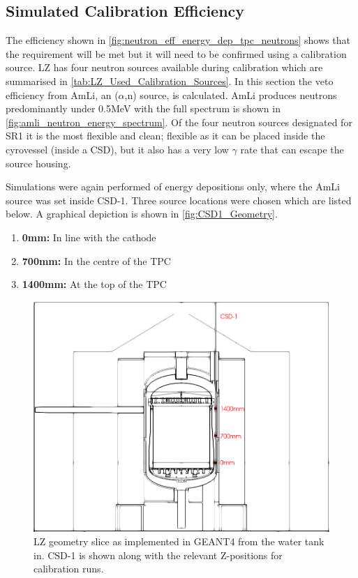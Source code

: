 \subsection{Simulated Calibration Efficiency}
\par
The efficiency shown in \autoref{fig:neutron_eff_energy_dep_tpc_neutrons} shows that the requirement will be met but it will need to be confirmed using a calibration source.
LZ has four neutron sources available during calibration which are summarised in \autoref{tab:LZ_Used_Calibration_Sources}.
In this section the veto efficiency from AmLi, an ($\alpha$,n) source, is calculated.
AmLi produces neutrons predominantly under 0.5MeV with the full spectrum is shown in \autoref{fig:amli_neutron_energy_spectrum}.
Of the four neutron sources designated for SR1 it is the most flexible and clean; flexible as it can be placed inside the cyrovessel (inside a CSD), but it also has a very low $\gamma$ rate that can escape the source housing.



\par
Simulations were again performed of energy depositions only, where the AmLi source was set inside CSD-1.
Three source locations were chosen which are listed below. A graphical depiction is shown in \autoref{fig:CSD1_Geometry}. 
\begin{enumerate}
    \item \textbf{0mm:} In line with the cathode
    \item \textbf{700mm:} In the centre of the TPC
    \item \textbf{1400mm:} At the top of the TPC
\end{enumerate}

\begin{figure}[!htbp]
\centering
\includegraphics[width=\textwidth]{Figures/Geometry/csd1_geometry_black_and_white.png}
\caption{LZ geometry slice as implemented in GEANT4 from the water tank in. CSD-1 is shown along with the relevant Z-positions for calibration runs.}
\label{fig:CSD1_Geometry}
\end{figure}


